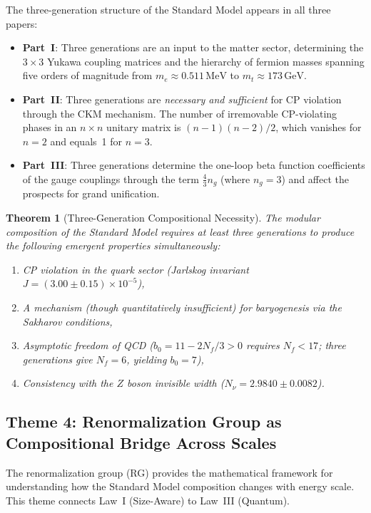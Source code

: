 \documentclass[12pt]{article}
\newtheorem{theorem}{Theorem}[section]
\theoremstyle{definition}
\theoremstyle{remark}
\newcommand{\GeV}{\,\mathrm{GeV}}
\newcommand{\MeV}{\,\mathrm{MeV}}
\begin{document}
The three-generation structure of the Standard Model appears in all three papers:

\begin{itemize}
\item \textbf{Part~I}: Three generations are an input to the matter sector, determining the $3 \times 3$ Yukawa coupling matrices and the hierarchy of fermion masses spanning five orders of magnitude from $m_e \approx 0.511\MeV$ to $m_t \approx 173\GeV$.

\item \textbf{Part~II}: Three generations are \emph{necessary and sufficient} for CP violation through the CKM mechanism. The number of irremovable CP-violating phases in an $n \times n$ unitary matrix is $(n-1)(n-2)/2$, which vanishes for $n = 2$ and equals~1 for $n = 3$.

\item \textbf{Part~III}: Three generations determine the one-loop beta function coefficients of the gauge couplings through the term $\frac{4}{3}n_g$ (where $n_g = 3$) and affect the prospects for grand unification.
\end{itemize}

\begin{theorem}[Three-Generation Compositional Necessity]
\label{thm:three-gen-necessity}
The modular composition of the Standard Model requires at least three generations to produce the following emergent properties simultaneously:
\begin{enumerate}
\item CP violation in the quark sector (Jarlskog invariant $J = (3.00 \pm 0.15) \times 10^{-5}$),
\item A mechanism (though quantitatively insufficient) for baryogenesis via the Sakharov conditions,
\item Asymptotic freedom of QCD ($b_0 = 11 - 2N_f/3 > 0$ requires $N_f < 17$; three generations give $N_f = 6$, yielding $b_0 = 7$),
\item Consistency with the $Z$ boson invisible width ($N_\nu = 2.9840 \pm 0.0082$).
\end{enumerate}
\end{theorem}

\subsection{Theme 4: Renormalization Group as Compositional Bridge Across Scales}

The renormalization group (RG) provides the mathematical framework for understanding how the Standard Model composition changes with energy scale. This theme connects Law~I (Size-Aware) to Law~III (Quantum).
\end{document}
